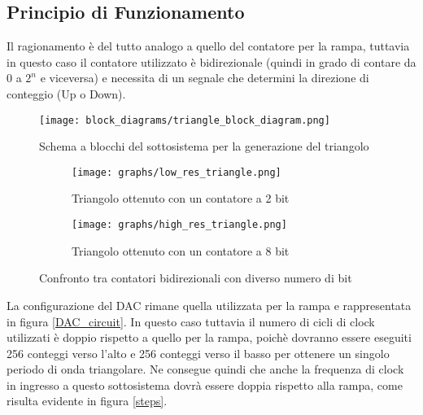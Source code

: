\subsection*{Principio di Funzionamento}


Il ragionamento è del tutto analogo a quello del contatore per la rampa, tuttavia in questo
caso il contatore utilizzato è bidirezionale (quindi in grado di contare da $0$ a $2^n$ e
viceversa) e necessita di un segnale che determini la direzione di conteggio (Up o Down).

\begin{figure}[H]
    \centering
    \texttt{[image: block\_diagrams/triangle\_block\_diagram.png]}
    \caption{Schema a blocchi del sottosistema per la generazione del triangolo}
    \label{triangle_block_diagram}
\end{figure}

\begin{figure}[H]
    \centering

    \begin{subfigure}{.5\textwidth}
        \centering
        \texttt{[image: graphs/low\_res\_triangle.png]}
        \caption{Triangolo ottenuto con un contatore a 2 bit}
        \label{low_res_triangle}
    \end{subfigure}%
    \begin{subfigure}{.5\textwidth}
        \centering
        \texttt{[image: graphs/high\_res\_triangle.png]}
        \caption{Triangolo ottenuto con un contatore a 8 bit}
        \label{high_res_triangle}
    \end{subfigure}

    \caption{Confronto tra contatori bidirezionali con diverso numero di bit}
    \label{triangles}
\end{figure}

La configurazione del DAC rimane quella utilizzata per la rampa e rappresentata in figura
\ref{DAC_circuit}. In questo caso tuttavia il numero di cicli di clock utilizzati è doppio
rispetto a quello per la rampa, poichè dovranno essere eseguiti 256 conteggi verso l'alto
e 256 conteggi verso il basso per ottenere un singolo periodo di onda triangolare. Ne
consegue quindi che anche la frequenza di clock in ingresso a questo sottosistema dovrà
essere doppia rispetto alla rampa, come risulta evidente in figura \ref{steps}.

